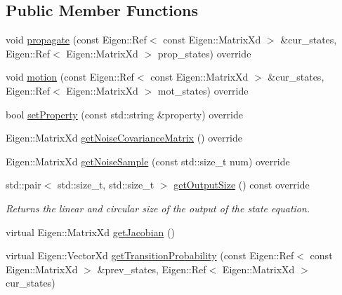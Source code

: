 \subsection*{Public Member Functions}
\begin{DoxyCompactItemize}
\item 
void \mbox{\hyperlink{classbfl_1_1StateModelDecorator_a9548415d6445c58778eeeadf48ff2672}{propagate}} (const Eigen\+::\+Ref$<$ const Eigen\+::\+Matrix\+Xd $>$ \&cur\+\_\+states, Eigen\+::\+Ref$<$ Eigen\+::\+Matrix\+Xd $>$ prop\+\_\+states) override
\item 
void \mbox{\hyperlink{classbfl_1_1StateModelDecorator_af0ffeccf4bfcf8ddb36f3e6704fae7d2}{motion}} (const Eigen\+::\+Ref$<$ const Eigen\+::\+Matrix\+Xd $>$ \&cur\+\_\+states, Eigen\+::\+Ref$<$ Eigen\+::\+Matrix\+Xd $>$ mot\+\_\+states) override
\item 
bool \mbox{\hyperlink{classbfl_1_1StateModelDecorator_ad292f3b665c1adf20a1f32dc8a065fec}{set\+Property}} (const std\+::string \&property) override
\item 
Eigen\+::\+Matrix\+Xd \mbox{\hyperlink{classbfl_1_1StateModelDecorator_ae70700c1fad6b788b21722e57f2d0f6b}{get\+Noise\+Covariance\+Matrix}} () override
\item 
Eigen\+::\+Matrix\+Xd \mbox{\hyperlink{classbfl_1_1StateModelDecorator_a6825b807be82c66feb8bbb62d240490b}{get\+Noise\+Sample}} (const std\+::size\+\_\+t num) override
\item 
std\+::pair$<$ std\+::size\+\_\+t, std\+::size\+\_\+t $>$ \mbox{\hyperlink{classbfl_1_1StateModelDecorator_a2b2f00e6825e382587a2edbbba4569de}{get\+Output\+Size}} () const override
\begin{DoxyCompactList}\small\item\em Returns the linear and circular size of the output of the state equation. \end{DoxyCompactList}\item 
virtual Eigen\+::\+Matrix\+Xd \mbox{\hyperlink{classbfl_1_1StateModel_a78df4b39578345142fcfb18abaab2177}{get\+Jacobian}} ()
\item 
virtual Eigen\+::\+Vector\+Xd \mbox{\hyperlink{classbfl_1_1StateModel_acb582cb7d41ec7b854ed1dbd8965b6fc}{get\+Transition\+Probability}} (const Eigen\+::\+Ref$<$ const Eigen\+::\+Matrix\+Xd $>$ \&prev\+\_\+states, Eigen\+::\+Ref$<$ Eigen\+::\+Matrix\+Xd $>$ cur\+\_\+states)
\end{DoxyCompactItemize}
